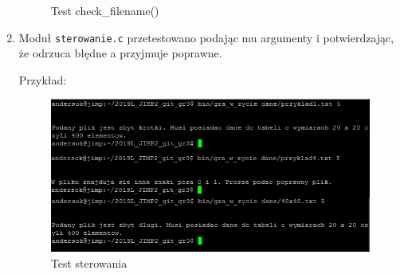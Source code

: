 \documentclass[12pt]{report}
\newcommand{\code}[1]{\texttt{#1}}
\begin{document}
\begin{enumerate}
\begin{figure}[H]
\caption{Test check\_filename()}
\label{test check_filename}
\end{figure}
\item Moduł \code{sterowanie.c} przetestowano podając mu argumenty i potwierdzając, że odrzuca błędne a przyjmuje poprawne.\par
Przykład:\par
\begin{figure}[H]
\centering
\includegraphics[width=14cm]{obrazy/teststerowanie.png}
\caption{Test sterowania}
\label{test sterowanie}
\end{figure}
\end{enumerate}
\end{document}
